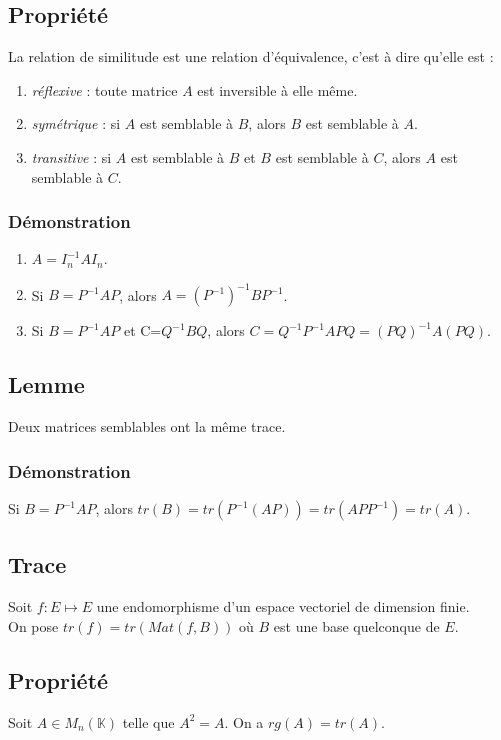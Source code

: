 \documentclass[a4paper,10pt]{book} %
\begin{document}
\subsection{Propriété}
La relation de similitude est une relation d'équivalence, c'est à dire qu'elle est :
\begin{enumerate}
\item \textit{réflexive} : toute matrice $A$ est inversible à elle même.
\item \textit{symétrique} : si $A$ est semblable à $B$, alors $B$ est semblable à $A$.
\item \textit{transitive} : si $A$ est semblable à $B$ et $B$ est semblable à $C$, alors $A$ est semblable à $C$.
\end{enumerate}

\subsubsection{Démonstration}
\begin{enumerate}
\item $A=I_n^{-1}AI_n$.
\item Si $B=P^{-1}AP$, alors $A=(P^{-1})^{-1}BP^{-1}$.
\item Si $B=P^{-1}AP$ et C=$Q^{-1}BQ$, alors $C=Q^{-1}P^{-1}APQ=(PQ)^{-1}A(PQ)$.
\end{enumerate}

\subsection{Lemme}
Deux matrices semblables ont la même trace.

\subsubsection{Démonstration}
Si $B=P^{-1}AP$, alors $tr(B)=tr(P^{-1}(AP))=tr(APP^{-1})=tr(A)$.

\subsection{Trace}
Soit $f:E\mapsto E$ une endomorphisme d'un espace vectoriel de dimension finie.\\
On pose $tr(f)=tr(Mat(f,B))$ où $B$ est une base quelconque de $E$.

\subsection{Propriété}
Soit $A\in M_n(\mathbb{K})$ telle que $A^2=A$. On a $rg(A)=tr(A)$.
\end{document}
